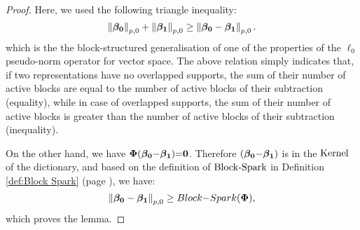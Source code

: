 \begin{proof}
Here, we used the following triangle inequality:
\begin{equation*}
\left\lVert\boldsymbol{\beta_0}\right\rVert_{p,0}+\left\lVert\boldsymbol{\beta_1}\right\rVert_{p,0} \geq \left\lVert\boldsymbol{\beta_0}-\boldsymbol{\beta_1}\right\rVert_{p,0}.
\end{equation*}
which is the the block-structured generalisation of one of the properties of the $\ell_0$ pseudo-norm operator for vector space.
The above relation simply indicates that, if two representations have no overlapped supports, the sum of their number of active blocks are equal to the number of active blocks of their subtraction (equality), while in case of overlapped supports, the sum of their number of active blocks is greater than the number of active blocks of their subtraction (inequality).

On the other hand, we have $\boldsymbol{\Phi}(\boldsymbol{\beta_0} {-} \boldsymbol{\beta_1}) {=} \boldsymbol{0}$. 
Therefore $(\boldsymbol{\beta_0} {-} \boldsymbol{\beta_1})$ is in the $\mathrm{Kernel}$ of the dictionary, and based on the definition of $\mathrm{Block\text{{-}}Spark}$ in Definition \ref{def:Block Spark} (page \pageref{def:Block Spark}), we have:
\begin{equation*}
\left\lVert\boldsymbol{\beta_0}-\boldsymbol{\beta_1}\right\rVert_{p,0} \geq Block{-}Spark(\boldsymbol{\Phi}),
\end{equation*}
which proves the lemma.
\end{proof}
